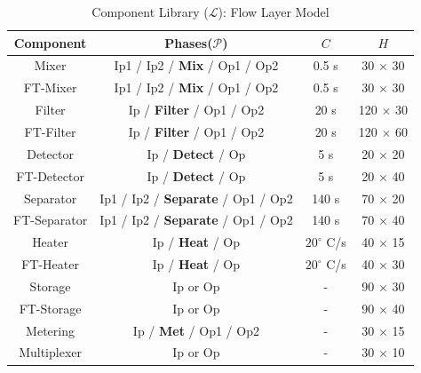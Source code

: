 \begin{table}[H]
\centering
\caption{Component Library ($\mathcal{L}$): Flow Layer Model}
\begin{tabular}{| c | c | c | c |}
\hline
\textbf{Component} & \textbf{Phases($\mathcal{P}$)} & \textbf{$C$} & \textbf{$H$} \\ \hline
Mixer & Ip1 / Ip2 / \textbf{Mix} / Op1 / Op2 & 0.5 s & 30 $\times$ 30\\ \hline
FT-Mixer & Ip1 / Ip2 / \textbf{Mix} / Op1 / Op2 & 0.5 s &  30 $\times$ 30 \\ \hline
Filter & Ip /  \textbf{Filter} / Op1 / Op2 & 20 s& 120 $\times$ 30 \\ \hline
FT-Filter & Ip /  \textbf{Filter} / Op1 / Op2 & 20 s& 120 $\times$ 60 \\ \hline
Detector & Ip / \textbf{Detect} / Op & 5 s & 20 $\times$ 20 \\ \hline
FT-Detector & Ip / \textbf{Detect} / Op & 5 s & 20 $\times$ 40 \\ \hline
Separator & Ip1 / Ip2 / \textbf{Separate} / Op1 / Op2 & 140 s & 70 $\times$ 20 \\ \hline
FT-Separator & Ip1 / Ip2 / \textbf{Separate} / Op1 / Op2 & 140 s & 70 $\times$ 40 \\ \hline
Heater & Ip / \textbf{Heat} / Op & $20^{\circ}$ C/s & 40 $\times$ 15\\ \hline
FT-Heater & Ip / \textbf{Heat} / Op & $20^{\circ}$ C/s & 40 $\times$ 30 \\ \hline
Storage & Ip or Op & - & 90 $\times$ 30 \\ \hline
FT-Storage & Ip or Op & - & 90 $\times$ 40 \\ \hline
Metering & Ip / \textbf{Met} / Op1 / Op2 & - & 30 $\times$ 15 \\ \hline
Multiplexer & Ip or Op & - & 30 $\times$ 10 \\ \hline
\end{tabular}
\label{tab:component-library}
\end{table}

